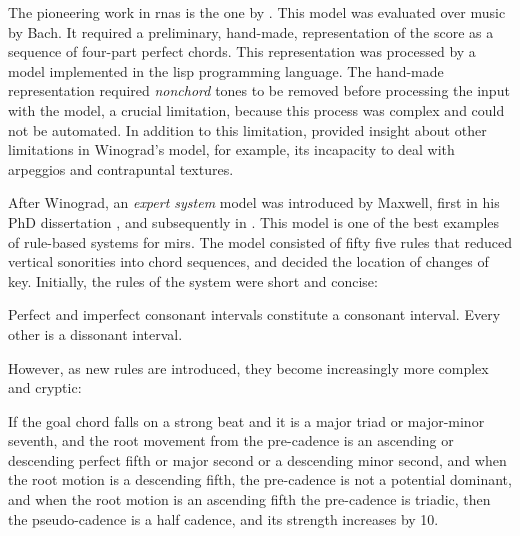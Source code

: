 


The pioneering work in \glspl{rna} is the one by
\textcite{winograd1968linguistics}. This model was evaluated
over music by Bach. It required a preliminary, hand-made,
representation of the score as a sequence of four-part
perfect chords. This representation was processed by a model
implemented in the \gls{lisp} programming language. The
hand-made representation required \emph{nonchord} tones to
be removed before processing the input with the model, a
crucial limitation, because this process was complex and
could not be automated. In addition to this limitation,
\textcite{temperley1997algorithm} provided insight about
other limitations in Winograd's model, for example, its
incapacity to deal with arpeggios and contrapuntal textures.

After Winograd, an \emph{expert system} model was introduced
by Maxwell, first in his PhD dissertation
\parencite{maxwell1984artificial}, and subsequently in
\textcite{maxwell1992expert}. This model is one of the best
examples of rule-based systems for \glspl{mir}. The model
consisted of fifty five rules that reduced vertical
sonorities into chord sequences, and decided the location of
changes of key. Initially, the rules of the system were
short and concise:

\begin{italicquotes}
    Perfect and imperfect consonant intervals constitute a
    consonant interval. Every other is a dissonant interval.
\end{italicquotes}

However, as new rules are introduced, they become
increasingly more complex and cryptic:

\begin{italicquotes}
    If the goal chord falls on a strong beat and it is a
    major triad or major-minor seventh, and the root
    movement from the pre-cadence is an ascending or
    descending perfect fifth or major second or a descending
    minor second, and when the root motion is a descending
    fifth, the pre-cadence is not a potential dominant, and
    when the root motion is an ascending fifth the
    pre-cadence is triadic, then the pseudo-cadence is a
    half cadence, and its strength increases by 10.
\end{italicquotes}

